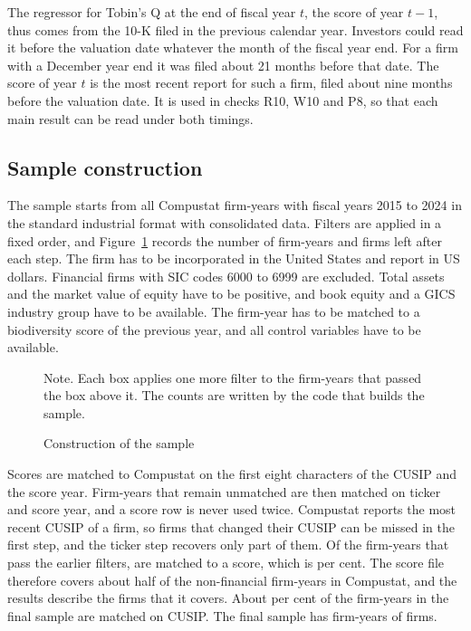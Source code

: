 \documentclass[12pt,a4paper]{article}
\newcommand{\tablenote}[1]{\par\smallskip\begin{minipage}{\linewidth}\footnotesize\setstretch{1.05}#1\end{minipage}}
\begin{document}
The regressor for Tobin's Q at the end of fiscal year $t$, the score of year $t-1$, thus comes from the 10-K filed in the previous calendar year. Investors could read it before the valuation date whatever the month of the fiscal year end. For a firm with a December year end it was filed about 21 months before that date. The score of year $t$ is the most recent report for such a firm, filed about nine months before the valuation date. It is used in checks R10, W10 and P8, so that each main result can be read under both timings.

\subsection{Sample construction}

The sample starts from all Compustat firm-years with fiscal years 2015 to 2024 in the standard industrial format with consolidated data. Filters are applied in a fixed order, and Figure~\ref{fig:sample} records the number of firm-years and firms left after each step. The firm has to be incorporated in the United States and report in US dollars. Financial firms with SIC codes 6000 to 6999 are excluded. Total assets and the market value of equity have to be positive, and book equity and a GICS industry group have to be available. The firm-year has to be matched to a biodiversity score of the previous year, and all control variables have to be available.

\begin{figure}[!htbp]
\centering

\caption{Construction of the sample}\label{fig:sample}
\tablenote{Note. Each box applies one more filter to the firm-years that passed the box above it. The counts are written by the code that builds the sample.}
\end{figure}

Scores are matched to Compustat on the first eight characters of the CUSIP and the score year. Firm-years that remain unmatched are then matched on ticker and score year, and a score row is never used twice. Compustat reports the most recent CUSIP of a firm, so firms that changed their CUSIP can be missed in the first step, and the ticker step recovers only part of them. Of the \nGics{} firm-years that pass the earlier filters, \nMatched{} are matched to a score, which is \pctMatched{} per cent. The score file therefore covers about half of the non-financial firm-years in Compustat, and the results describe the firms that it covers. About \pctCusip{} per cent of the firm-years in the final sample are matched on CUSIP. The final sample has \nFinal{} firm-years of \nFirmsFinal{} firms.
\end{document}
